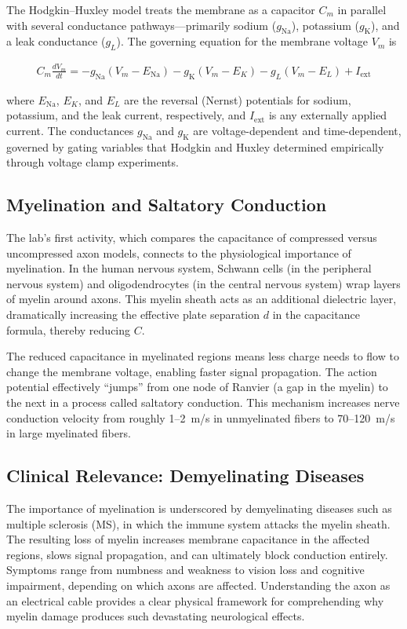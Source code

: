 \message{ !name(lab_report.tex)}\documentclass[12pt]{article}
\begin{document}
The Hodgkin--Huxley model treats the membrane as a capacitor $C_m$ in parallel with several conductance pathways---primarily sodium ($g_{\text{Na}}$), potassium ($g_{\text{K}}$), and a leak conductance ($g_L$). The governing equation for the membrane voltage $V_m$ is

\begin{align*}
    C_m \frac{dV_m}{dt} = -g_{\text{Na}}(V_m - E_{\text{Na}}) - g_{\text{K}}(V_m - E_K) - g_L(V_m - E_L) + I_{\text{ext}}
\end{align*}

where $E_{\text{Na}}$, $E_K$, and $E_L$ are the reversal (Nernst) potentials for sodium, potassium, and the leak current, respectively, and $I_{\text{ext}}$ is any externally applied current. The conductances $g_{\text{Na}}$ and $g_{\text{K}}$ are voltage-dependent and time-dependent, governed by gating variables that Hodgkin and Huxley determined empirically through voltage clamp experiments.

\subsection{Myelination and Saltatory Conduction}

The lab's first activity, which compares the capacitance of compressed versus uncompressed axon models, connects to the physiological importance of myelination. In the human nervous system, Schwann cells (in the peripheral nervous system) and oligodendrocytes (in the central nervous system) wrap layers of myelin around axons. This myelin sheath acts as an additional dielectric layer, dramatically increasing the effective plate separation $d$ in the capacitance formula, thereby reducing $C$.

The reduced capacitance in myelinated regions means less charge needs to flow to change the membrane voltage, enabling faster signal propagation. The action potential effectively ``jumps'' from one node of Ranvier (a gap in the myelin) to the next in a process called saltatory conduction. This mechanism increases nerve conduction velocity from roughly 1--2~m/s in unmyelinated fibers to 70--120~m/s in large myelinated fibers.

\subsection{Clinical Relevance: Demyelinating Diseases}

The importance of myelination is underscored by demyelinating diseases such as multiple sclerosis (MS), in which the immune system attacks the myelin sheath. The resulting loss of myelin increases membrane capacitance in the affected regions, slows signal propagation, and can ultimately block conduction entirely. Symptoms range from numbness and weakness to vision loss and cognitive impairment, depending on which axons are affected. Understanding the axon as an electrical cable provides a clear physical framework for comprehending why myelin damage produces such devastating neurological effects.
\end{document}
